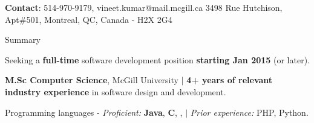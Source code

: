\documentclass{resume} %
\begin{document}
\begin{hSubsection}{\textbf{Contact}: 514-970-9179, vineet.kumar@mail.mcgill.ca}
{%
}{3498 Rue Hutchison, Apt\#501, Montreal, QC, Canada - H2X 2G4}
\end{hSubsection}



\begin{rSection}{Summary} \smallskip \begin{lSubsection} 
\item Seeking a \textbf{full-time} software development position
\textbf{starting Jan 2015} (or later).  
\item \textbf{M.Sc Computer Science}, McGill University $\vert$
\textbf{4+ years of relevant industry experience} in software design and
development.
\item Programming languages - \emph{Proficient:} \textbf{Java}, \textbf{C}, {\xten},
\matlab
$\vert$ \emph{Prior experience:} PHP, Python.
\end{lSubsection}
\end{rSection}
\end{document}

